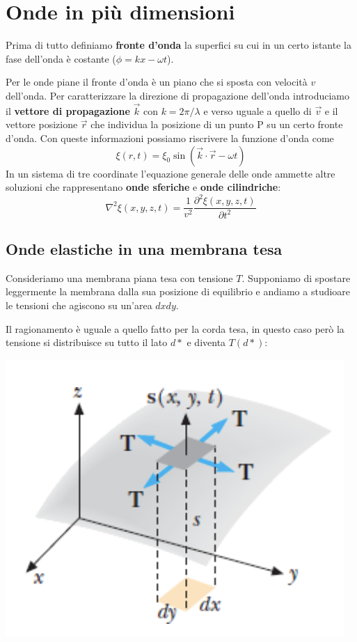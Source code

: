 \documentclass[x11names]{report}
\begin{document}
	
	\section{Onde in più dimensioni}	
	Prima di tutto definiamo \textbf{fronte d'onda} la superfici su cui in un certo istante la fase dell'onda è costante (\(\phi = kx -\omega t\)). 
	
	Per le onde piane il fronte d'onda è un piano che si sposta con velocità \(v\) dell'onda. Per caratterizzare la direzione di propagazione dell'onda introduciamo il \textbf{vettore di propagazione} \(\vec{k}\) con \(k = 2\pi/\lambda\) e verso uguale a quello di \(\vec{v}\) e il vettore posizione \(\vec{r}\) che individua la posizione di un punto P su un certo fronte d'onda. Con queste informazioni possiamo riscrivere la funzione d'onda come
	\[ 
	\xi(r,t) = \xi_0 \sin\left(\vec{k}\cdot \vec{r}- \omega t\right) 
	\]
	In un sistema di tre coordinate l'equazione generale delle onde ammette altre soluzioni che rappresentano \textbf{onde sferiche} e \textbf{onde cilindriche}: 
	\[ 
	\nabla^2\xi (x,y,z,t) = \frac{1}{v^2}\frac{\partial^2\xi (x,y,z,t)}{\partial t^2}
	\]
	\subsection{Onde elastiche in una membrana tesa}
	Consideriamo una membrana piana tesa con tensione \(T\). Supponiamo di spostare leggermente la membrana dalla sua posizione di equilibrio e andiamo a studioare le tensioni che agiscono su un'area \(dxdy\). 
	
	Il ragionamento è uguale a quello fatto per la corda tesa, in questo caso però la tensione si distribuisce su tutto il lato \(d*\) e diventa \(T(d*)\):
	
	\begin{center}
		\includegraphics[scale=0.35]{imgs/membrana.png}
	\end{center}
	
\end{document}

